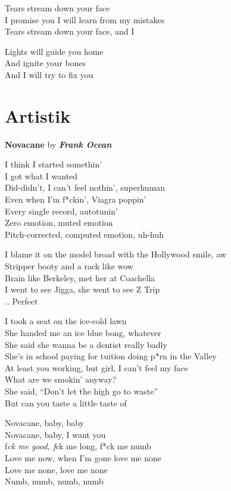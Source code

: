 \documentclass[
  letterpaper,
  DIV=11,
  numbers=noendperiod]{scrreprt}
\begin{document}
Tears stream down your face\\
I promise you I will learn from my mistakes\\
Tears stream down your face, and I

Lights will guide you home\\
And ignite your bones\\
And I will try to fix you

\section{Artistik}\label{artistik}

\textbf{Novacane} by \textbf{\emph{Frank Ocean}}

I think I started somethin'\\
I got what I wanted\\
Did-didn't, I can't feel nothin', superhuman\\
Even when I'm f*ckin', Viagra poppin'\\
Every single record, autotunin'\\
Zero emotion, muted emotion\\
Pitch-corrected, computed emotion, uh-huh

I blame it on the model broad with the Hollywood smile, aw\\
Stripper booty and a rack like wow\\
Brain like Berkeley, met her at Coachella\\
I went to see Jigga, she went to see Z Trip\\
.. Perfect

I took a seat on the ice-cold lawn\\
She handed me an ice blue bong, whatever\\
She said she wanna be a dentist really badly\\
She's in school paying for tuition doing p*rn in the Valley\\
At least you working, but girl, I can't feel my face\\
What are we smokin' anyway?\\
She said, ``Don't let the high go to waste''\\
But can you taste a little taste of

Novacane, baby, baby\\
Novacane, baby, I want you\\
f\emph{ck me good, f}ck me long, f*ck me numb\\
Love me now, when I'm gone love me none\\
Love me none, love me none\\
Numb, numb, numb, numb
\end{document}
